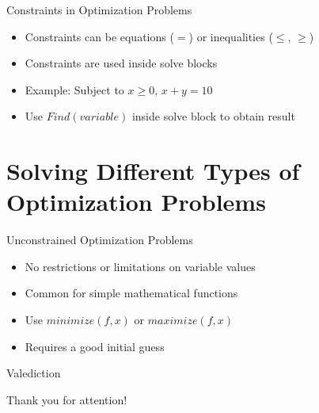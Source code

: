 \documentclass{beamer}
\begin{document}
\begin{frame}{Constraints in Optimization Problems}
\begin{itemize}
\item Constraints can be equations ($=$) or inequalities ($\leq$, $\geq$)
\item Constraints are used inside solve blocks
\item Example: Subject to $x \geq 0$, $x + y = 10$
\item Use $Find(variable)$ inside solve block to obtain result
\end{itemize}
\end{frame}

\section{Solving Different Types of Optimization Problems}

\begin{frame}{Unconstrained Optimization Problems}
\begin{itemize}
\item No restrictions or limitations on variable values
\item Common for simple mathematical functions
\item Use $minimize(f, x)$ or $maximize(f, x)$
\item Requires a good initial guess
\end{itemize}
\end{frame}

\begin{frame}{Valediction}
\begin{center}
\Huge Thank you for attention!
\end{center}
\end{frame}
\end{document}
